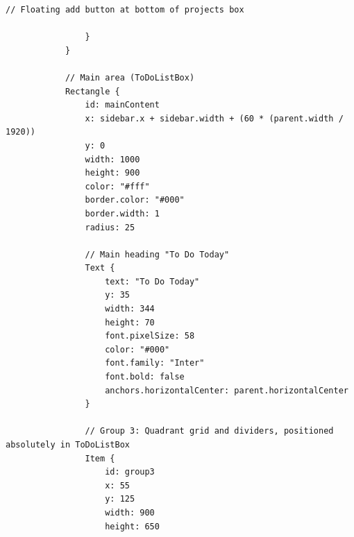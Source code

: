 \documentclass{report}
\begin{document}
\begin{lstlisting}[style=qmlstyle]
                    // Floating add button at bottom of projects box

                }
            }

            // Main area (ToDoListBox)
            Rectangle {
                id: mainContent
                x: sidebar.x + sidebar.width + (60 * (parent.width / 1920))
                y: 0
                width: 1000
                height: 900
                color: "#fff"
                border.color: "#000"
                border.width: 1
                radius: 25

                // Main heading "To Do Today"
                Text {
                    text: "To Do Today"
                    y: 35
                    width: 344
                    height: 70
                    font.pixelSize: 58
                    color: "#000"
                    font.family: "Inter"
                    font.bold: false
                    anchors.horizontalCenter: parent.horizontalCenter
                }

                // Group 3: Quadrant grid and dividers, positioned absolutely in ToDoListBox
                Item {
                    id: group3
                    x: 55
                    y: 125
                    width: 900
                    height: 650


\end{lstlisting}
\end{document}

